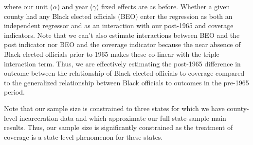 \documentclass[12pt]{article}
\begin{document}
where our unit ($\alpha$) and year ($\gamma$) fixed effects are as before.  Whether a given county had any Black elected officials (BEO) enter the regression as both an independent regressor and as an interaction with our post-1965 and coverage indicators. Note that we can't also estimate interactions between BEO and the post indicator nor BEO and the coverage indicator because the near absence of Black elected officials prior to 1965 makes these co-linear with the triple interaction term.  Thus, we are effectively estimating the post-1965 difference in outcome between the relationship of Black elected officials to coverage compared to the generalized relationship between Black officials to outcomes in the pre-1965 period.

Note that our sample size is constrained to three states for which we have county-level incarceration data and which approximate our full state-sample main results.  Thus, our sample size is significantly constrained as the treatment of coverage is a state-level phenomenon for these states.


\end{document}

